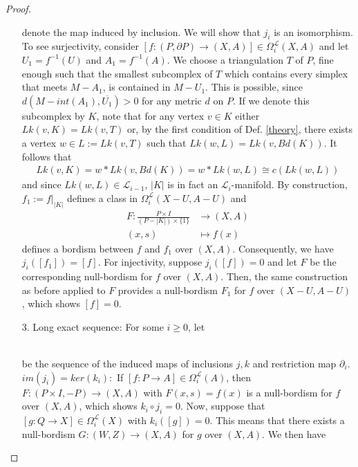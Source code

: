\documentclass{scrreprt}
\begin{document}
\begin{proof}
\begin{itemize}
\begin{equation*}
\end{equation*}
denote the map induced by inclusion. We will show that $j_i$ is an isomorphism. To see surjectivity, consider $[f: (P, \partial P) \to (X,A)] \in \Omega_i^{\mathcal{L}}(X,A)$ and let $U_1 = f^{-1}(U)$ and $A_1= f^{-1}(A)$. We choose a triangulation $T$ of $P$, fine enough such that the smallest subcomplex of $T$ which contains every simplex that meets $M-A_1$, is contained in $M-U_1$. This is possible, since $d(M-int(A_1), \overline{U_1})>0$ for any metric $d$ on $P$. If we denote this subcomplex by $K$, note that for any vertex $v \in K$ either $Lk(v,K)=Lk(v,T)$ or, by the first condition of Def. \ref{theory}, there exists a vertex $w \in L:= Lk(v,T)$ such that $Lk(w,L)=Lk(v,Bd(K))$. It follows that
\begin{align*}
Lk(v,K) = w * Lk(v,Bd(K)) = w * Lk(w,L) \cong c(Lk(w,L))
\end{align*}
and since $Lk(w,L) \in \mathcal{L}_{i-1}$, $|K|$ is in fact an $\mathcal{L}_i$-manifold. By construction, $f_1:=f|_{|K|}$ defines a class in $\Omega_i^{\mathcal{L}}(X-U,A-U)$ and 
\begin{align*}
F: \frac{P \times I}{ (P-|K|) \times \{ 1 \} } &\to (X,A) \\
(x,s) &\mapsto f(x)
\end{align*}
defines a bordism between $f$ and $f_1$ over $(X,A)$. Consequently, we have $j_i ([f_1]) = [f]$. For injectivity, suppose $j_i([f])=0$ and let $F$ be the corresponding null-bordism for $f$ over $(X,A)$. Then, the same construction as before applied to $F$ provides a null-bordism $F_1$ for $f$ over $(X-U,A-U)$, which shows $[f]=0$.
\item[3.] Long exact sequence: For some $i \geq 0$, let \\
\\
be the sequence of the induced maps of inclusions $j,k$ and restriction map $\partial_i$. \\
{$im(j_i) = ker(k_i):$} If $[f:P \to A] \in \Omega_i^{\mathcal{L}}(A)$, then $F: (P \times I, -P) \to (X,A)$ with $F(x,s)=f(x)$ is a null-bordism for $f$ over $(X,A)$, which shows $k_i \circ j_i = 0$. Now, suppose that $[g: Q \to X] \in \Omega_i^{\mathcal{L}}(X)$ with $k_i([g])=0$. This means that there exists a null-bordism $G: (W,Z) \to (X,A)$ for $g$ over $(X,A)$. We then have 

\end{itemize}
\end{proof}
\end{document}
